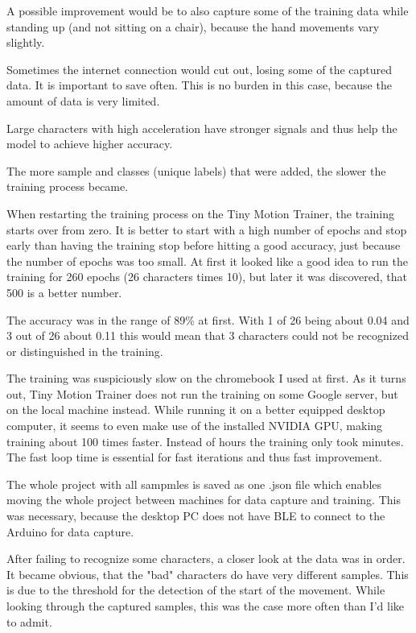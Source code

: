 \documentclass[a4paper,titlepage]{article}
\begin{document}
A possible improvement would be to also capture some of the training data while standing up (and not sitting on a chair), because the hand movements vary slightly.

Sometimes the internet connection would cut out, losing some of the captured data.
It is important to save often.
This is no burden in this case, because the amount of data is very limited.

Large characters with high acceleration have stronger signals and thus help the model to achieve higher accuracy.

The more sample and classes (unique labels) that were added, the slower the training process became.

When restarting the training process on the Tiny Motion Trainer, the training starts over from zero.
It is better to start with a high number of epochs and stop early than having the training stop before hitting a good accuracy, just because the number of epochs was too small.
At first it looked like a good idea to run the training for 260 epochs (26 characters times 10), but later it was discovered, that 500 is a better number.

The accuracy was in the range of 89\% at first.
With 1 of 26 being about 0.04 and 3 out of 26 about 0.11 this would mean that 3 characters could not be recognized or distinguished in the training.

The training was suspiciously slow on the chromebook I used at first.
As it turns out, Tiny Motion Trainer does not run the training on some Google server, but on the local machine instead.
While running it on a better equipped desktop computer, it seems to even make use of the installed NVIDIA GPU, making training about 100 times faster.
Instead of hours the training only took minutes.
The fast loop time is essential for fast iterations and thus fast improvement.

The whole project with all sampmles is saved as one .json file which enables moving the whole project between machines for data capture and training.
This was necessary, because the desktop PC does not have BLE to connect to the Arduino for data capture.

After failing to recognize some characters, a closer look at the data was in order.
It became obvious, that the "bad" characters do have very different samples.
This is due to the threshold for the detection of the start of the movement.
While looking through the captured samples, this was the case more often than I'd like to admit.
\end{document}
